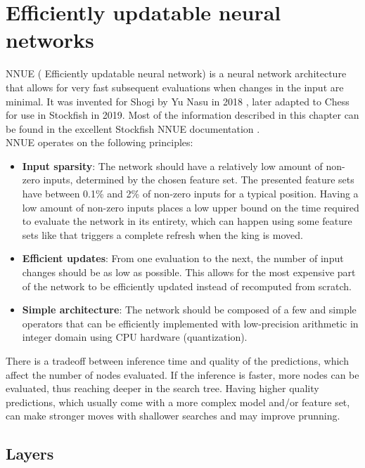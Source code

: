 \section{Efficiently updatable neural networks}

NNUE ( Efficiently updatable neural network) is a neural network architecture that allows for very fast subsequent evaluations when changes in the input are minimal. It was invented for Shogi by Yu Nasu in 2018 \cite{nnue:2018}, later adapted to Chess for use in Stockfish in 2019. Most of the information described in this chapter can be found in the excellent Stockfish NNUE documentation \cite{nnue-pytorch}. \\

NNUE operates on the following principles:

\begin{itemize}
    \item \textbf{Input sparsity}: The network should have a relatively low amount of non-zero inputs, determined by the chosen feature set. The presented feature sets have between 0.1\% and 2\% of non-zero inputs for a typical position. Having a low amount of non-zero inputs places a low upper bound on the time required to evaluate the network in its entirety, which can happen using some feature sets like  that triggers a complete refresh when the king is moved.
    \item \textbf{Efficient updates}: From one evaluation to the next, the number of input changes should be as low as possible. This allows for the most expensive part of the network to be efficiently updated instead of recomputed from scratch.
    \item \textbf{Simple architecture}: The network should be composed of a few and simple operators that can be efficiently implemented with low-precision arithmetic in integer domain using CPU hardware (quantization).

\end{itemize}

There is a tradeoff between inference time and quality of the predictions, which affect the number of nodes evaluated. If the inference is faster, more nodes can be evaluated, thus reaching deeper in the search tree. Having higher quality predictions, which usually come with a more complex model and/or feature set, can make stronger moves with shallower searches and may improve prunning.

\subsection{Layers}

